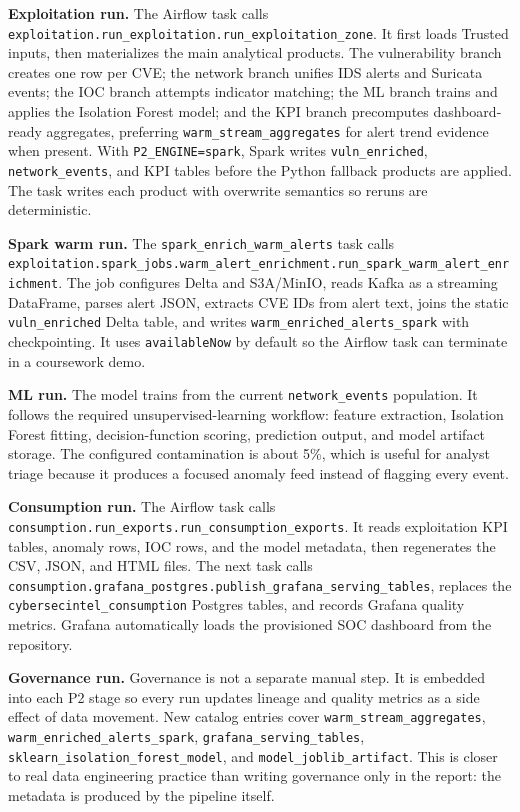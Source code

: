 \documentclass[11pt,a4paper]{article}
\newcommand{\code}[1]{\nolinkurl{#1}}
\begin{document}
\textbf{Exploitation run.} The Airflow task calls \code{exploitation.run_exploitation.run_exploitation_zone}. It first loads Trusted inputs, then materializes the main analytical products. The vulnerability branch creates one row per CVE; the network branch unifies IDS alerts and Suricata events; the IOC branch attempts indicator matching; the ML branch trains and applies the Isolation Forest model; and the KPI branch precomputes dashboard-ready aggregates, preferring \code{warm_stream_aggregates} for alert trend evidence when present. With \code{P2_ENGINE=spark}, Spark writes \code{vuln_enriched}, \code{network_events}, and KPI tables before the Python fallback products are applied. The task writes each product with overwrite semantics so reruns are deterministic.

\textbf{Spark warm run.} The \code{spark_enrich_warm_alerts} task calls \code{exploitation.spark_jobs.warm_alert_enrichment.run_spark_warm_alert_enrichment}. The job configures Delta and S3A/MinIO, reads Kafka as a streaming DataFrame, parses alert JSON, extracts CVE IDs from alert text, joins the static \code{vuln_enriched} Delta table, and writes \code{warm_enriched_alerts_spark} with checkpointing. It uses \code{availableNow} by default so the Airflow task can terminate in a coursework demo.

\textbf{ML run.} The model trains from the current \code{network_events} population. It follows the required unsupervised-learning workflow: feature extraction, Isolation Forest fitting, decision-function scoring, prediction output, and model artifact storage. The configured contamination is about 5\%, which is useful for analyst triage because it produces a focused anomaly feed instead of flagging every event.

\textbf{Consumption run.} The Airflow task calls \code{consumption.run_exports.run_consumption_exports}. It reads exploitation KPI tables, anomaly rows, IOC rows, and the model metadata, then regenerates the CSV, JSON, and HTML files. The next task calls \code{consumption.grafana_postgres.publish_grafana_serving_tables}, replaces the \code{cybersecintel_consumption} Postgres tables, and records Grafana quality metrics. Grafana automatically loads the provisioned SOC dashboard from the repository.

\textbf{Governance run.} Governance is not a separate manual step. It is embedded into each P2 stage so every run updates lineage and quality metrics as a side effect of data movement. New catalog entries cover \code{warm_stream_aggregates}, \code{warm_enriched_alerts_spark}, \code{grafana_serving_tables}, \code{sklearn_isolation_forest_model}, and \code{model_joblib_artifact}. This is closer to real data engineering practice than writing governance only in the report: the metadata is produced by the pipeline itself.
\end{document}
